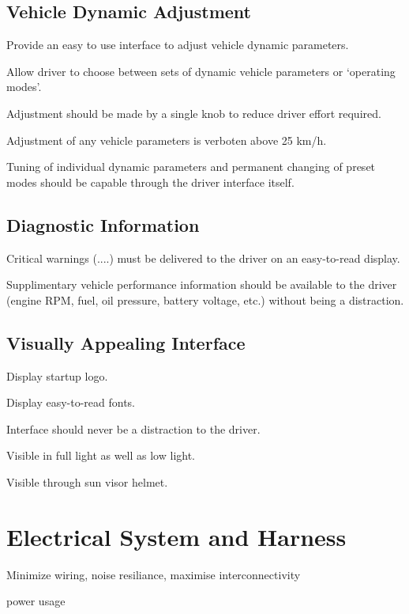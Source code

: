 \subsection{Vehicle Dynamic Adjustment}

Provide an easy to use interface to adjust vehicle dynamic parameters.

Allow driver to choose between sets of dynamic vehicle parameters
or `operating modes'.

Adjustment should be made by a single knob to reduce driver effort
required.

Adjustment of any vehicle parameters is verboten above 25 km/h.

Tuning of individual dynamic parameters and permanent changing of
preset modes should be capable through the driver interface itself.


\subsection{Diagnostic Information}

Critical warnings (....) must be delivered to the driver on an easy-to-read
display.

Supplimentary vehicle performance information should be available
to the driver (engine RPM, fuel, oil pressure, battery voltage, etc.)
without being a distraction.


\subsection{Visually Appealing Interface}

Display startup logo.

Display easy-to-read fonts.

Interface should never be a distraction to the driver.

Visible in full light as well as low light.

Visible through sun visor helmet.


\section{Electrical System and Harness}

Minimize wiring, noise resiliance, maximise interconnectivity

power usage